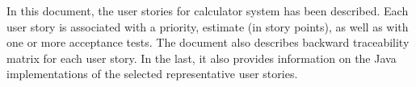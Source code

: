 In this document, the user stories for calculator system has been described. Each user story is associated with a priority, estimate (in story points), as well as with one or more acceptance tests. The document also describes backward traceability matrix for each user story. In the last, it also provides information on the Java implementations of the selected representative user stories.